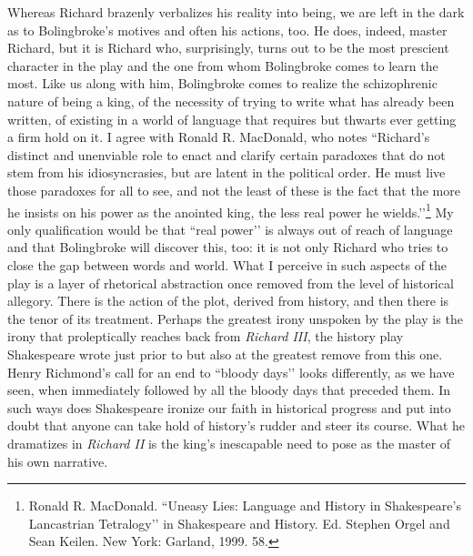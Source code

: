 Whereas Richard brazenly verbalizes his reality into being, we are left in the dark as to Bolingbroke’s motives and often his actions, too.
He does, indeed, master Richard, but it is Richard who, surprisingly, turns out to be the most prescient character in the play and the one from whom Bolingbroke comes to learn the most.
Like us along with him, Bolingbroke comes to realize the schizophrenic nature of being a king, of the necessity of trying to write what has already been written, of existing in a world of language that requires but thwarts ever getting a firm hold on it.
I agree with Ronald R.
MacDonald, who notes ``Richard’s distinct and unenviable role to enact and clarify certain paradoxes that do not stem from his idiosyncrasies, but are latent in the political order.
He must live those paradoxes for all to see, and not the least of these is the fact that the more he insists on his power as the anointed king, the less real power he wields.’’\footnote{Ronald R. MacDonald. ``Uneasy Lies: Language and History in Shakespeare’s Lancastrian Tetralogy’’ in Shakespeare and History. Ed. Stephen Orgel and Sean Keilen. New York: Garland, 1999. 58.} My only qualification would be that ``real power’’ is always out of reach of language and that Bolingbroke will discover this, too: it is not only Richard who tries to close the gap between words and world.
What I perceive in such aspects of the play is a layer of rhetorical abstraction once removed from the level of historical allegory.
There is the action of the plot, derived from history, and then there is the tenor of its treatment.
Perhaps the greatest irony unspoken by the play is the irony that proleptically reaches back from \emph{Richard III}, the history play Shakespeare wrote just prior to but also at the greatest remove from this one.
Henry Richmond’s call for an end to ``bloody days’’ looks differently, as we have seen, when immediately followed by all the bloody days that preceded them.
In such ways does Shakespeare ironize our faith in historical progress and put into doubt that anyone can take hold of history’s rudder and steer its course.
What he dramatizes in \emph{Richard II} is the king’s inescapable need to pose as the master of his own narrative.

